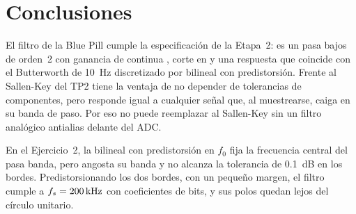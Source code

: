 \section{Conclusiones}

El filtro de la Blue Pill cumple la especificación de la Etapa~2: es un pasa bajos de orden~2 con ganancia de continua \nm{\resGanDC}, corte en \val{\resFTres}{\hertz} y una respuesta que coincide con el Butterworth de \SI{10}{\hertz} discretizado por bilineal con predistorsión. Frente al Sallen-Key del TP2 tiene la ventaja de no depender de tolerancias de componentes, pero responde igual a cualquier señal que, al muestrearse, caiga en su banda de paso. Por eso no puede reemplazar al Sallen-Key sin un filtro analógico antialias delante del ADC.

En el Ejercicio~2, la bilineal con predistorsión en $f_0$ fija la frecuencia central del pasa banda, pero angosta su banda y no alcanza la tolerancia de \SI{0,1}{\dB} en los bordes. Predistorsionando los dos bordes, con un pequeño margen, el filtro cumple a $f_s = \SI{200}{\kilo\hertz}$ con coeficientes de \ejMinBits{} bits, y sus polos quedan lejos del círculo unitario.

